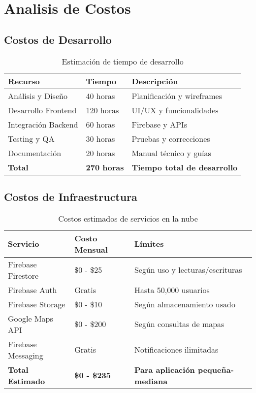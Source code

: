 \documentclass[12pt,a4paper]{article}
\begin{document}
\section{Analisis de Costos}

\subsection{Costos de Desarrollo}
\begin{table}[H]
\centering
\begin{tabular}{@{}lll@{}}
\toprule
\textbf{Recurso} & \textbf{Tiempo} & \textbf{Descripción} \\
\midrule
Análisis y Diseño & 40 horas & Planificación y wireframes \\
Desarrollo Frontend & 120 horas & UI/UX y funcionalidades \\
Integración Backend & 60 horas & Firebase y APIs \\
Testing y QA & 30 horas & Pruebas y correcciones \\
Documentación & 20 horas & Manual técnico y guías \\
\midrule
\textbf{Total} & \textbf{270 horas} & \textbf{Tiempo total de desarrollo} \\
\bottomrule
\end{tabular}
\caption{Estimación de tiempo de desarrollo}
\end{table}

\subsection{Costos de Infraestructura}
\begin{table}[H]
\centering
\begin{tabular}{@{}lll@{}}
\toprule
\textbf{Servicio} & \textbf{Costo Mensual} & \textbf{Límites} \\
\midrule
Firebase Firestore & \$0 - \$25 & Según uso y lecturas/escrituras \\
Firebase Auth & Gratis & Hasta 50,000 usuarios \\
Firebase Storage & \$0 - \$10 & Según almacenamiento usado \\
Google Maps API & \$0 - \$200 & Según consultas de mapas \\
Firebase Messaging & Gratis & Notificaciones ilimitadas \\
\midrule
\textbf{Total Estimado} & \textbf{\$0 - \$235} & \textbf{Para aplicación pequeña-mediana} \\
\bottomrule
\end{tabular}
\caption{Costos estimados de servicios en la nube}
\end{table}
\end{document}
